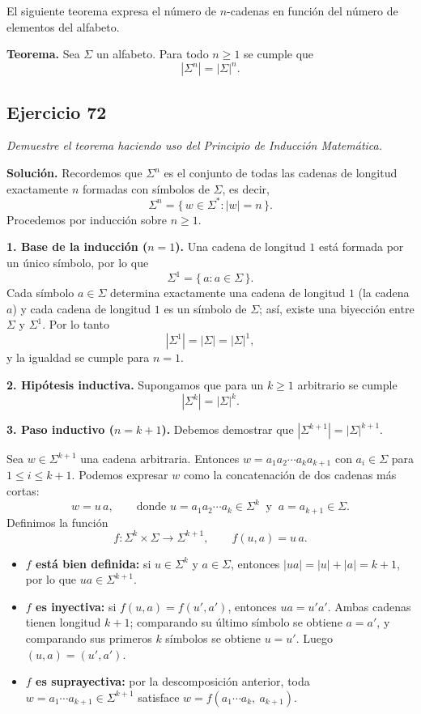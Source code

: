 
\noindent El siguiente teorema expresa el número de $n$-cadenas en función del
número de elementos del alfabeto.

\medskip
\noindent\textbf{Teorema.} Sea $\Sigma$ un alfabeto. Para todo $n \geq 1$ se cumple que
\[
|\Sigma^n| = |\Sigma|^n .
\]

\subsection*{Ejercicio 72}

\noindent\textit{Demuestre el teorema haciendo uso del Principio de Inducción Matemática.}

\medskip
\noindent\textbf{Solución.} Recordemos que $\Sigma^n$ es el conjunto de todas las
cadenas de longitud exactamente $n$ formadas con símbolos de $\Sigma$, es decir,
\[
\Sigma^n = \{\, w \in \Sigma^* : |w| = n \,\}.
\]
Procedemos por inducción sobre $n \geq 1$.

\medskip
\noindent\textbf{1. Base de la inducción ($n = 1$).}
Una cadena de longitud $1$ está formada por un único símbolo, por lo que
\[
\Sigma^1 = \{\, a : a \in \Sigma \,\}.
\]
Cada símbolo $a \in \Sigma$ determina exactamente una cadena de longitud $1$ (la
cadena $a$) y cada cadena de longitud $1$ es un símbolo de $\Sigma$; así, existe una
biyección entre $\Sigma$ y $\Sigma^1$. Por lo tanto
\[
|\Sigma^1| = |\Sigma| = |\Sigma|^1 ,
\]
y la igualdad se cumple para $n = 1$.

\medskip
\noindent\textbf{2. Hipótesis inductiva.}
Supongamos que para un $k \geq 1$ arbitrario se cumple
\[
|\Sigma^k| = |\Sigma|^k .
\]

\medskip
\noindent\textbf{3. Paso inductivo ($n = k+1$).}
Debemos demostrar que $|\Sigma^{k+1}| = |\Sigma|^{k+1}$.

Sea $w \in \Sigma^{k+1}$ una cadena arbitraria. Entonces $w = a_1 a_2 \cdots a_k a_{k+1}$
con $a_i \in \Sigma$ para $1 \leq i \leq k+1$. Podemos expresar $w$ como la
concatenación de dos cadenas más cortas:
\[
w = u\,a, \qquad \text{donde } u = a_1 a_2 \cdots a_k \in \Sigma^k
\ \text{ y } \ a = a_{k+1} \in \Sigma .
\]
Definimos la función
\[
f : \Sigma^k \times \Sigma \longrightarrow \Sigma^{k+1}, \qquad f(u, a) = u\,a .
\]

\begin{itemize}
    \item \textbf{$f$ está bien definida:} si $u \in \Sigma^k$ y $a \in \Sigma$, entonces
    $|ua| = |u| + |a| = k + 1$, por lo que $ua \in \Sigma^{k+1}$.
    \item \textbf{$f$ es inyectiva:} si $f(u,a) = f(u',a')$, entonces $ua = u'a'$. Ambas
    cadenas tienen longitud $k+1$; comparando su último símbolo se obtiene
    $a = a'$, y comparando sus primeros $k$ símbolos se obtiene $u = u'$. Luego
    $(u,a) = (u',a')$.
    \item \textbf{$f$ es suprayectiva:} por la descomposición anterior, toda
    $w = a_1 \cdots a_{k+1} \in \Sigma^{k+1}$ satisface
    $w = f(a_1 \cdots a_k,\ a_{k+1})$.
\end{itemize}


